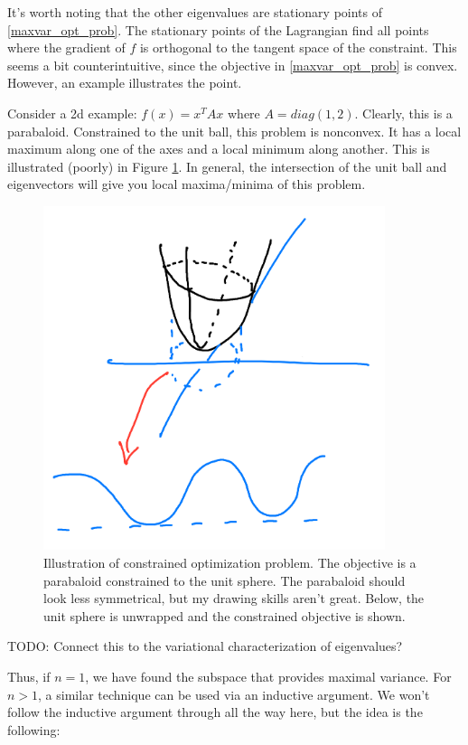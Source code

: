 It's worth noting that the other eigenvalues are stationary points of \eqref{maxvar_opt_prob}. The stationary points of the Lagrangian find all points where the gradient of $f$ is orthogonal to the tangent space of the constraint. This seems a bit counterintuitive, since the objective in \eqref{maxvar_opt_prob} is convex. However, an example illustrates the point. 

Consider a 2d example: $f(x) = x^T A x$ where $A = diag(1, 2)$. Clearly, this is a parabaloid. Constrained to the unit ball, this problem is nonconvex. It has a local maximum along one of the axes and a local minimum along another. This is illustrated (poorly) in Figure \ref{fig:constrained-eig-opt}. In general, the intersection of the unit ball and eigenvectors will give you local maxima/minima of this problem. 

\begin{figure}[h] \label{fig:constrained-eig-opt}
\centering
\includegraphics[width=10cm]{figs/PCA/Constrained-opt-eig.png}
\caption{Illustration of constrained optimization problem. The objective is a parabaloid constrained to the unit sphere. The parabaloid should look less symmetrical, but my drawing skills aren't great. Below, the unit sphere is unwrapped and the constrained objective is shown.}
\end{figure}

TODO: Connect this to the variational characterization of eigenvalues? 

Thus, if $n = 1$, we have found the subspace that provides maximal variance. For $n>1$, a similar technique can be used via an inductive argument. We won't follow the inductive argument through all the way here, but the idea is the following:

